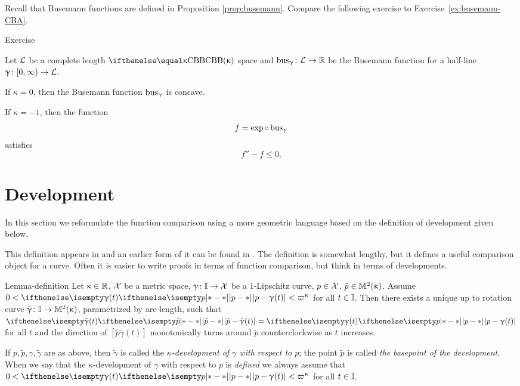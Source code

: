 Recall that Busemann functions are defined in Proposition \ref{prop:busemann}.
Compare the following exercise to Exercise~\ref{ex:busemann-CBA}.

\begin{thm}{Exercise}\label{ex:busemann-CBB}
{\sloppy 
Let $\mathcal{L}$ be a complete length $\Alex{\kappa}$ space
and $\bus_\gamma\:\spc{L}\to \RR$ be the Busemann function for a half-line $\gamma\:[0,\infty)\to \spc{L}$.

}

\begin{subthm}{}
If $\kappa=0$, then the Busemann function $\mathop{\rm bus}\nolimits_\upgamma$ is  concave.
\end{subthm}

\begin{subthm}{}
If $\kappa=-1$, then the function 
\[f=\exp\circ\bus_\gamma\] 
satisfies
\[f''- f\le 0.\]
\end{subthm}

\end{thm}

\section{Development}

In this section we reformulate the function comparison using a more geometric language based on the definition of development given below.

This definition appears in \cite{alexandrov:devel}
and an earlier form of it can be found in \cite{liberman}.
The definition is somewhat lengthy, but it defines a useful comparison object for a curve. 
Often it is easier to write proofs in terms of function comparison,
but think in terms of developments.

\begin{thm}{Lemma-definition}\label{lem:devel}\label{def:devel}
Let $\kappa\in \RR$, 
$\mathcal{X}$ be a metric space, 
$\gamma\:\II\to \spc{X}$ be a $1$-Lipschitz curve,
$p\in \spc{X}$,
$\tilde p\in\Lob2{\kappa}$.
Assume $0<\dist{p}{\gamma(t)}{} < \varpi\kappa$ for
all $t\in \II$.
Then there exists a unique up to rotation curve
$\tilde \gamma\: \II\to \Lob2\kappa$, parametrized by arc-length, 
such that
$\dist{\tilde p}{\tilde \gamma(t)}{}\z=\dist{p}{\gamma(t)}{}$ for all $t$
and the direction of
$[\tilde p\tilde \gamma(t)]$ monotonically turns around $\tilde p$ counterclockwise as $t$ increases.

\smallskip

If $p,\tilde p,\gamma,\tilde \gamma$ are as above,
then $\tilde \gamma$ is called the \emph{$\kappa$-development of $\gamma$ with respect to $p$}; 
the point $\tilde p$ is called \emph{the basepoint of the development}.
When we say that the $\kappa$-development of $\gamma$ with respect to $p$ is {}\emph{defined} we always assume that $0<\dist{p}{\gamma(t)}{} < \varpi\kappa$ for
all 
$t\in \II$.
\end{thm}


